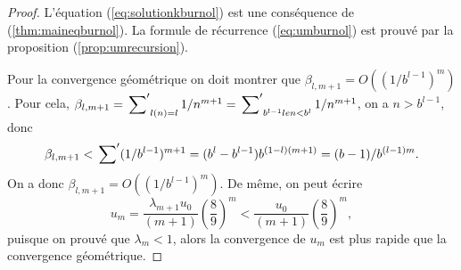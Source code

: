 \begin{proof}
	L'\'equation (\ref{eq:solutionkburnol}) est une cons\'equence de
	(\ref{thm:maineqburnol}). La formule de r\'ecurrence (\ref{eq:umburnol})
	est prouv\'e par la proposition (\ref{prop:umrecursion}).

	Pour la convergence g\'eom\'etrique on doit montrer que $\beta_{l, m+1} =
	O((1/b^{l-1})^{m})$. Pour cela, $\beta_{l, m+1} = \sideset{}{'}\sum_{l(n) = l} 1/n^{m+1} =
	\sideset{}{'}\sum_{b^{l-1} le n < b^{l}} 1/n^{m+1}$, on a $n > b^{l-1}$, donc
	\[
		\beta_{l, m+1} < \sideset{}{'}\sum (1/b^{l-1})^{m+1} = (b^{l}-b^{l-1})b^{(1-l)(m+1)}
		= (b-1)/b^{(l-1)m}.
	\]
	On a donc $\beta_{l, m+1} = O((1/b^{l-1})^{m})$. De m\^{e}me, on peut
	\'ecrire 
	\[
		u_{m} = \frac{\lambda_{m+1}u_{0}}{(m+1)}\left(\frac{8}{9}\right)^{m}
		< \frac{u_{0}}{(m+1)}\left(\frac{8}{9}\right)^{m},
	\]
	puisque on prouv\'e que $\lambda_{m} < 1$, alors la convergence de $u_{m}$ est
	plus rapide que la convergence g\'eom\'etrique.
\end{proof}
